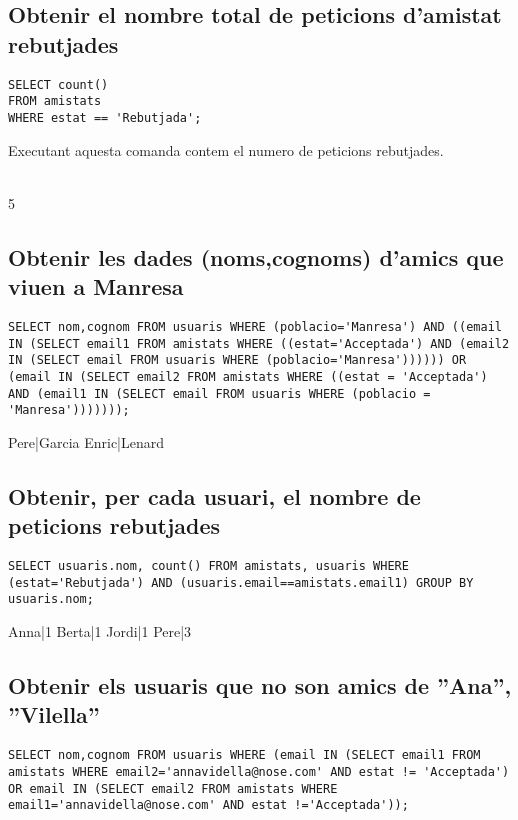 \documentclass[11p]{article}
\begin{document}
\subsection{Obtenir el nombre total de peticions d’amistat rebutjades}

\begin{lstlisting}
SELECT count() 
FROM amistats 
WHERE estat == 'Rebutjada';

\end{lstlisting}

Executant aquesta comanda contem el numero de peticions rebutjades.\\\\
\centerline{5}

\subsection{Obtenir les dades (noms,cognoms) d’amics que viuen a Manresa}

\begin{lstlisting}
SELECT nom,cognom FROM usuaris WHERE (poblacio='Manresa') AND ((email IN (SELECT email1 FROM amistats WHERE ((estat='Acceptada') AND (email2 IN (SELECT email FROM usuaris WHERE (poblacio='Manresa')))))) OR (email IN (SELECT email2 FROM amistats WHERE ((estat = 'Acceptada') AND (email1 IN (SELECT email FROM usuaris WHERE (poblacio = 'Manresa')))))));
\end{lstlisting}

Pere|Garcia
Enric|Lenard

\subsection{Obtenir, per cada usuari, el nombre de peticions rebutjades}
\begin{lstlisting}
SELECT usuaris.nom, count() FROM amistats, usuaris WHERE (estat='Rebutjada') AND (usuaris.email==amistats.email1) GROUP BY usuaris.nom;
\end{lstlisting}

Anna|1
Berta|1
Jordi|1
Pere|3


\subsection{Obtenir els usuaris que no son amics de ”Ana”, ”Vilella”}
\begin{lstlisting}
SELECT nom,cognom FROM usuaris WHERE (email IN (SELECT email1 FROM amistats WHERE email2='annavidella@nose.com' AND estat != 'Acceptada') OR email IN (SELECT email2 FROM amistats WHERE email1='annavidella@nose.com' AND estat !='Acceptada'));
\end{lstlisting}
\end{document}

